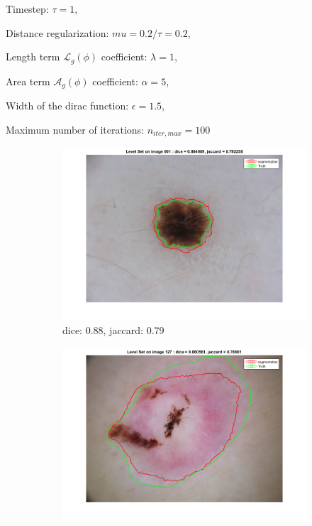 \documentclass[a4paper,10pt]{article}
\begin{document}
Timestep: $\tau=1$,

Distance regularization: $mu=0.2/\tau= 0.2$, 

Length term $\mathcal{L}_g(\phi)$ coefficient: $\lambda=1$,

Area term $\mathcal{A}_g(\phi)$ coefficient: $\alpha = 5$,

Width of the dirac function: $\epsilon=1.5$,

Maximum number of iterations: $n_{iter,max} = 100$ 

\begin{figure}[h]
	\centering
	\begin{subfigure}{0.49\linewidth}			
		\includegraphics[width=0.99\linewidth]{../results/level_set/im001}
		\caption{dice: 0.88, jaccard: 0.79}
		\label{fig:LS-res-001}
	\end{subfigure}
	\begin{subfigure}{0.49\linewidth}			
		\includegraphics[width=0.99\linewidth]{../results/level_set/im127}

\end{subfigure}
\end{figure}
\end{document}
